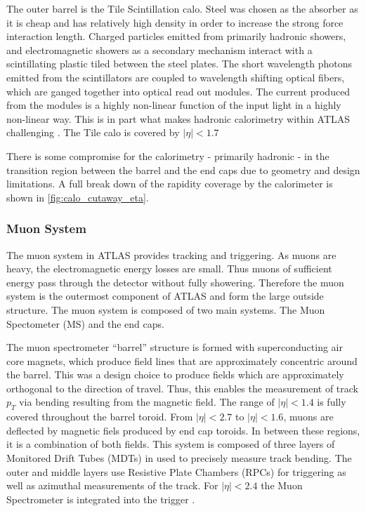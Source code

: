 \documentclass[12pt]{article}
\begin{document}
The outer barrel is the Tile Scintillation calo. Steel was chosen as the
absorber as it is cheap and has relatively high density in order to increase the
strong force interaction length. Charged particles emitted from primarily
hadronic showers, and electromagnetic showers as a secondary mechanism interact
with a scintillating plastic tiled between the steel plates. The short
wavelength photons emitted from the scintillators are coupled to wavelength
shifting optical fibers, which are ganged together into optical read out
modules. The current produced from the modules is a highly non-linear function
of the input light in a highly non-linear way. This is in part what makes
hadronic calorimetry within ATLAS challenging
\cite{The_ATLAS_Collaboration_2008, ml4p}. The Tile calo is covered by
$|\eta|<1.7$

There is some compromise for the calorimetry - primarily hadronic - in the
transition region between the barrel and the end caps due to geometry and design
limitations. A full break down of the rapidity coverage by the calorimeter is
shown in \ref{fig:calo_cutaway_eta}.

\subsubsection{Muon System}

The muon system in ATLAS provides tracking and triggering. As
muons are heavy, the electromagnetic energy losses are small. Thus muons of
sufficient energy pass through the detector without fully showering. Therefore
the muon system is the outermost component of ATLAS and form the large outside
structure. The muon system is composed of two main systems. The Muon Spectometer
(MS) and the end caps. 

The muon spectrometer ``barrel'' structure is formed with
superconducting air core magnets, which produce field lines that are
approximately concentric around the barrel. This was a design choice to produce
fields which are approximately orthogonal to the direction of travel. Thus, this
enables the measurement of track $p_T$ via bending resulting from the magnetic
field. The range of $|\eta|<1.4$ is fully covered throughout the barrel toroid.
From $|\eta| < 2.7$ to $|\eta| < 1.6$, muons are deflected by magnetic fiels
produced by end cap toroids. In between these regions, it is a combination of
both fields. This system is composed of three layers of Monitored Drift Tubes (MDTs) in
used to precisely measure track bending. The outer and middle layers use
Resistive Plate Chambers (RPCs) for triggering as well as azimuthal measurements
of the track. For $|\eta|<2.4$ the Muon Spectrometer is integrated into the
trigger \cite{Aad_2024}.
\end{document}

